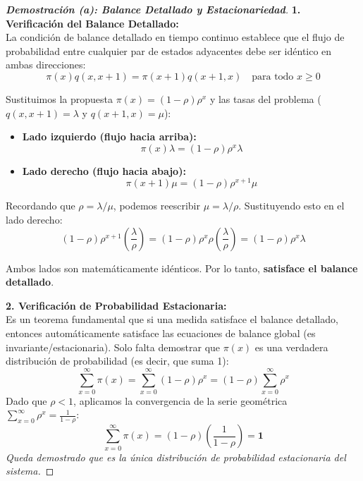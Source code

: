\documentclass[10pt,a4paper]{article}
\begin{document}
\begin{proof}[\textbf{Demostración (a): Balance Detallado y Estacionariedad}]
    \textbf{1. Verificación del Balance Detallado:} \\
    La condición de balance detallado en tiempo continuo establece que el flujo de probabilidad entre cualquier par de estados adyacentes debe ser idéntico en ambas direcciones:
    \[ \pi(x)q(x, x+1) = \pi(x+1)q(x+1, x) \quad \text{para todo } x \ge 0 \]
    
    Sustituimos la propuesta $\pi(x) = (1-\rho)\rho^x$ y las tasas del problema ($q(x,x+1)=\lambda$ y $q(x+1,x)=\mu$):
    \begin{itemize}
        \item \textbf{Lado izquierdo (flujo hacia arriba):} 
        \[ \pi(x)\lambda = (1-\rho)\rho^x \lambda \]
        \item \textbf{Lado derecho (flujo hacia abajo):} 
        \[ \pi(x+1)\mu = (1-\rho)\rho^{x+1} \mu \]
    \end{itemize}
    
    Recordando que $\rho = \lambda/\mu$, podemos reescribir $\mu = \lambda/\rho$. Sustituyendo esto en el lado derecho:
    \[ (1-\rho)\rho^{x+1} \left( \frac{\lambda}{\rho} \right) = (1-\rho)\rho^x \rho \left( \frac{\lambda}{\rho} \right) = (1-\rho)\rho^x \lambda \]
    
    Ambos lados son matemáticamente idénticos. Por lo tanto, \textbf{satisface el balance detallado}.
    
    \vspace{3mm}
    \textbf{2. Verificación de Probabilidad Estacionaria:} \\
    Es un teorema fundamental que si una medida satisface el balance detallado, entonces automáticamente satisface las ecuaciones de balance global (es invariante/estacionaria). 
    Solo falta demostrar que $\pi(x)$ es una verdadera distribución de probabilidad (es decir, que suma 1):
    \[ \sum_{x=0}^\infty \pi(x) = \sum_{x=0}^\infty (1-\rho)\rho^x = (1-\rho) \sum_{x=0}^\infty \rho^x \]
    Dado que $\rho < 1$, aplicamos la convergencia de la serie geométrica $\sum_{x=0}^\infty \rho^x = \frac{1}{1-\rho}$:
    \[ \sum_{x=0}^\infty \pi(x) = (1-\rho) \left( \frac{1}{1-\rho} \right) = \mathbf{1} \]
    \textit{Queda demostrado que es la única distribución de probabilidad estacionaria del sistema.}
\end{proof}

\newpage
\end{document}
